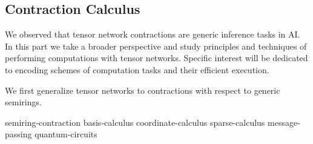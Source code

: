 \begin{partbacktext}
    \part{Contraction Calculus}

    We observed that tensor network contractions are generic inference tasks in AI.
    In this part we take a broader perspective and study principles and techniques of performing computations with tensor networks.
    Specific interest will be dedicated to encoding schemes of computation tasks and their efficient execution.

    We first generalize tensor networks to contractions with respect to generic semirings.

\end{partbacktext}

{semiring-contraction}
{basis-calculus}
{coordinate-calculus}
{sparse-calculus}
{message-passing}
{quantum-circuits}